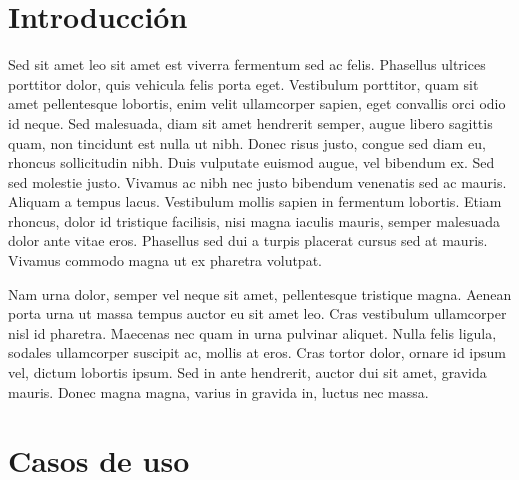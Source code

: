 \documentclass[a4paper, 10pt, twoside]{article}
\begin{document}
\newpage

\tableofcontents

\newpage



\section{Introducción}

Sed sit amet leo sit amet est viverra fermentum sed ac felis. Phasellus ultrices porttitor dolor, quis vehicula felis porta eget. Vestibulum porttitor, quam sit amet pellentesque lobortis, enim velit ullamcorper sapien, eget convallis orci odio id neque. Sed malesuada, diam sit amet hendrerit semper, augue libero sagittis quam, non tincidunt est nulla ut nibh. Donec risus justo, congue sed diam eu, rhoncus sollicitudin nibh. Duis vulputate euismod augue, vel bibendum ex. Sed sed molestie justo. Vivamus ac nibh nec justo bibendum venenatis sed ac mauris. Aliquam a tempus lacus. Vestibulum mollis sapien in fermentum lobortis. Etiam rhoncus, dolor id tristique facilisis, nisi magna iaculis mauris, semper malesuada dolor ante vitae eros. Phasellus sed dui a turpis placerat cursus sed at mauris. Vivamus commodo magna ut ex pharetra volutpat.

Nam urna dolor, semper vel neque sit amet, pellentesque tristique magna. Aenean porta urna ut massa tempus auctor eu sit amet leo. Cras vestibulum ullamcorper nisl id pharetra. Maecenas nec quam in urna pulvinar aliquet. Nulla felis ligula, sodales ullamcorper suscipit ac, mollis at eros. Cras tortor dolor, ornare id ipsum vel, dictum lobortis ipsum. Sed in ante hendrerit, auctor dui sit amet, gravida mauris. Donec magna magna, varius in gravida in, luctus nec massa.


\newpage


\section{Casos de uso}
\end{document}
